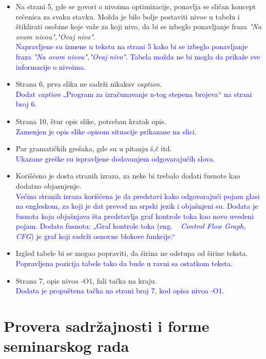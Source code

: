 \documentclass[a4paper]{report}
\newcommand{\odgovor}[1]{\textcolor{blue}{#1}}
\begin{document}
\begin{itemize}
    \item Na strani 5, gde se govori o nivoima optimizacije, ponavlja se sličan koncept rečenica za svaku stavku. Možda je bilo bolje postaviti nivoe u tabelu i štiklirati osobine koje važe za koji nivo, da bi se izbeglo ponavljanje fraza \textit{"Na ovom nivou","Ovaj nivo"}. \\
          \odgovor{Napravljene su izmene u tekstu na strani 5 kako bi se izbeglo ponavljanje fraza \textit{"Na ovom nivou","Ovaj nivo"}. Tabela možda ne bi mogla da prikaže sve informacije o nivoima.}
    \item Strana 6, prva slika ne sadrži nikakav \textit{caption}. \\
         \odgovor{Dodat \textit{caption} „Program za izračunavanje n-tog stepena brojeva“ na strani broj 6.}
    \item Strana 10, štur opis slike, potreban kratak opis. \\
          \odgovor{ Zamenjen je opis slike opisom situacije prikazane na slici. } 
    \item Par gramatičkih grešaka, gde su u pitanju š,č itd. \\
         \odgovor{Ukazane greške su ispravljene dodavanjem odgovarajućih slova.}
    \item Korišćeno je dosta stranih izraza, za neke bi trebalo dodati fusnote kao dodatno objasnjenje. \\
          \odgovor{Većina stranih izraza korišćena je da predstavi kako odgovarajući pojam glasi na engleskom, za koji je dat prevod na srpski jezik i objašnjeni su.
                   Dodata je fusnota koja objašnjava šta predstavlja graf kontrole toka kao novo uvedeni pojam.
                   Dodata fusnota: „Graf kontrole toka (eng. ~ {\em Control Flow Graph, CFG}) je graf koji sadrži osnovne blokove funkcije.“
          }
    \item Izgled tabele bi se mogao popraviti, da širina ne odstupa od širine teksta. \\
    \odgovor{ Popravljena pozicija tabele tako da bude u ravni sa ostatkom teksta.} 
    \item Strana 7, opis nivoa -O1, fali tačka na kraju. \\
         \odgovor{Dodata je propuštena tačka na strani broj 7, kod opisa nivoa -O1.}
    
\end{itemize}


\section{Provera sadržajnosti i forme seminarskog rada}
\end{document}
